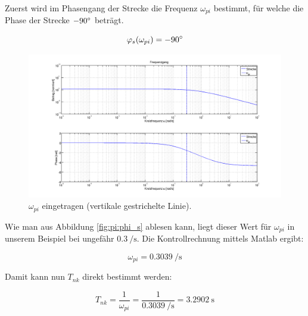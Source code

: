 Zuerst wird im Phasengang der Strecke die Frequenz $\omega_{pi}$ bestimmt, f\"ur
welche die Phase der Strecke $-90\degree$ betr\"agt.

\begin{equation} \label{eq:pi:phi_s}
    \varphi_s(\omega_{pi}) = -90 \degree
\end{equation}

\begin{figure}[h! width=\pagewidth]
    \includegraphics[width=.9\textwidth]{images/piStreckeOmegaPI.png}
    \caption{%
        $\omega_{pi}$ eingetragen (vertikale gestrichelte Linie).
    }
    \label{fig:pi:omega_pi}
\end{figure}

Wie man aus Abbildung \ref{fig:pi:phi_s} ablesen kann, liegt dieser Wert f\"ur
$\omega_{pi}$ in unserem  Beispiel bei ungef\"ahr $\SI{0.3}{\per\second}$. Die
Kontrollrechnung mittels Matlab ergibt:

\begin{equation} \label{eq:pi:omega_pi}
    \omega_{pi} = \SI{0.3039}{\per\second}
\end{equation}

Damit kann nun $T_{nk}$ direkt bestimmt werden\footnotemark[1]:

\begin{equation} \label{eq:pi:omega_pi}
    T_{nk} = \frac{1}{\omega_{pi}} = \frac{1}{\SI{0.3039}{\per\second}} = \SI{3.2902}{\second}
\end{equation}


